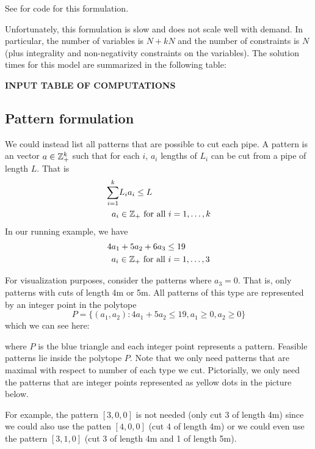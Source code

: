 See  for code for this formulation.

Unfortunately, this formulation is slow and does not scale well with demand.  In particular, the number of variables is $N + kN$ and the number of constraints is $N$ (plus integrality and non-negativity constraints on the variables).  
The solution times for this model are summarized in the following table:
\begin{center}
\textbf{INPUT TABLE OF COMPUTATIONS}
\end{center}


\subsection{Pattern formulation}
We could instead list all patterns that are possible to cut each pipe.   A pattern is an vector $a \in {\mathbb{Z}}^k_+$ such that for each $i$, $a_i$ lengths of $L_i$ can be cut from a pipe of length $L$.  That is
\begin{equation}
\begin{split}
\sum_{i=1}^k &L_i a_i \leq L\\
a_i &\in {\mathbb{Z}}_+ \ \mbox{for all } i=1, \dots, k
\end{split}
\end{equation}
In our running example, we have 
\begin{equation}
\begin{split}
4 &a_1 + 5 a_2 + 6 a_3 \leq 19\\
&a_i \in {\mathbb{Z}}_+ \ \mbox{for all } i=1, \dots, 3
\end{split}
\end{equation}


For visualization purposes, consider the patterns where $a_3 = 0$.  That is, only patterns with cuts of length 4m or 5m.  All patterns of this type are represented by an integer point in the polytope 
\begin{equation}
P = \{(a_1,a_2) : 4a_1 + 5 a_2 \leq 19, a_1\geq 0, a_2 \geq 0\}
\end{equation}
which we can see here:
\begin{center}
\end{center}
where $P$ is the blue triangle and each integer point represents a pattern.  Feasible patterns lie inside the polytope $P$.  Note that we only need patterns that are maximal with respect to number of each type we cut.  Pictorially, we only need the patterns that are integer points represented as yellow dots in the picture below.
\begin{center}
\end{center}
For example, the pattern $[3,0,0]$ is not needed (only cut 3 of length 4m) since we could also use the patten $[4,0,0]$ (cut 4 of  length 4m) or we could even use the pattern $[3,1,0]$  (cut 3 of length 4m and 1 of length 5m).

